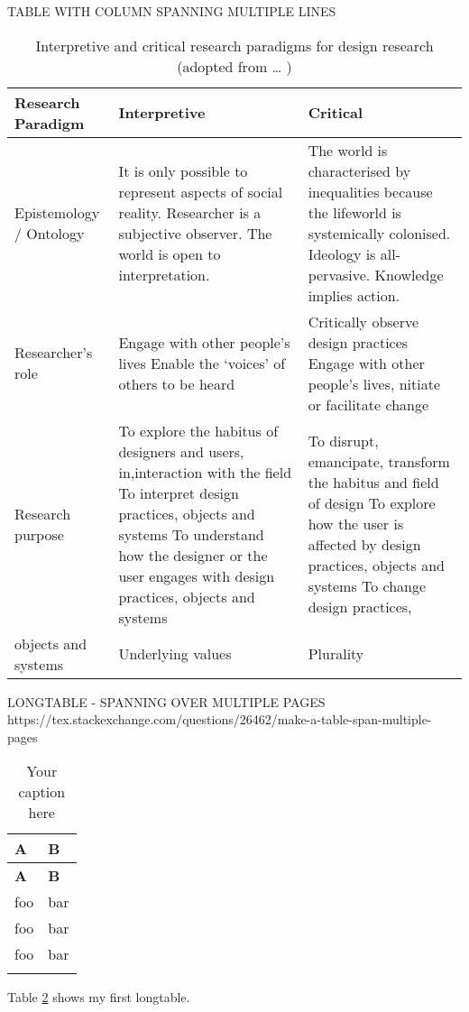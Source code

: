TABLE WITH COLUMN SPANNING MULTIPLE LINES
\begin{table}[h]
    \caption{Interpretive and critical research paradigms for design research (adopted from \ldots%
    )}
    \label{crouch}
    \begin{tabular}{  l  p{3.4cm}  p{3.4cm} }
        \toprule
\textbf{Research Paradigm}      
& \textbf{Interpretive}   
& \textbf{Critical} \\\midrule
Epistemology / Ontology 
& It is only possible to represent aspects of social reality. Researcher is a subjective observer. The world is open to interpretation.        
& The world is characterised by inequalities because the lifeworld is systemically colonised. Ideology is all-pervasive. Knowledge implies action. \\\hline

Researcher’s role       
& Engage with other people’s lives Enable the ‘voices’ of others to be heard
& Critically observe design practices Engage with other people’s lives, nitiate or facilitate change  \\\hline

Research purpose        
& To explore the habitus of designers and users, in,interaction with the field To interpret design practices, objects and systems To understand how the designer or the user engages with design practices, objects and systems 
& To disrupt, emancipate, transform the habitus and field of design To explore how the user is affected by design practices, objects and systems To change design practices, \\\hline

objects and systems 
& Underlying values       
& Plurality \\
        \bottomrule
    \end{tabular}
\end{table}

LONGTABLE - SPANNING OVER MULTIPLE PAGES
https://tex.stackexchange.com/questions/26462/make-a-table-span-multiple-pages
\usepackage{longtable}

\begin{longtable}{| p{} | p{} |}
\caption{Your caption here} %
\hline
 \hline
 \textbf{A} & \textbf{B} \\ \hline
 \endfirsthead
 \textbf{A} & \textbf{B} \\ \hline
 \endhead
foo & bar \\ \hline 
foo & bar \\ \hline
foo & bar \\ \hline
\caption{Your caption here} %
\label{tab:myfirstlongtable}
\end{longtable}
Table \ref{tab:myfirstlongtable} shows my first longtable.


